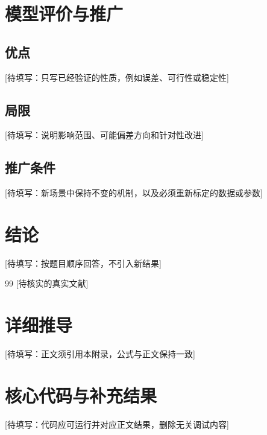 \documentclass[UTF8,a4paper,12pt]{ctexart}
\begin{document}
\section{模型评价与推广}
\subsection{优点}
[待填写：只写已经验证的性质，例如误差、可行性或稳定性]

\subsection{局限}
[待填写：说明影响范围、可能偏差方向和针对性改进]

\subsection{推广条件}
[待填写：新场景中保持不变的机制，以及必须重新标定的数据或参数]

\section{结论}
[待填写：按题目顺序回答，不引入新结果]

\begin{thebibliography}{99}
 [待核实的真实文献]
\end{thebibliography}

\appendix
\section{详细推导}
[待填写：正文须引用本附录，公式与正文保持一致]

\section{核心代码与补充结果}
[待填写：代码应可运行并对应正文结果，删除无关调试内容]
\end{document}
